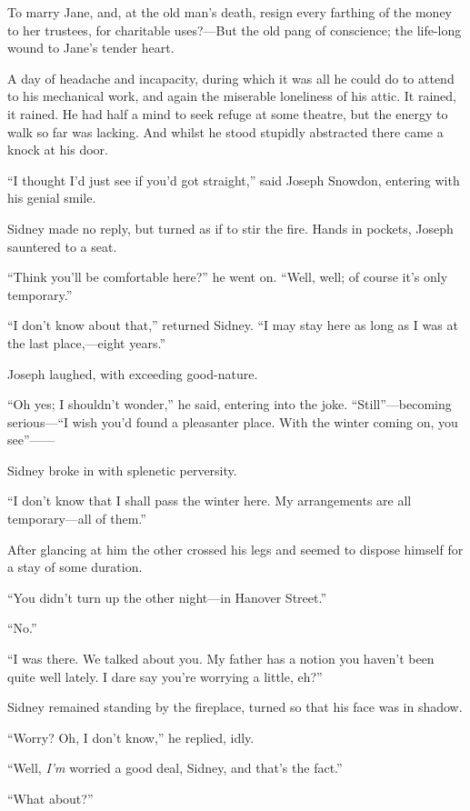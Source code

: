 To marry Jane, and, at the old man's death, resign every farthing of the
money to her trustees, for charitable uses?---But the old pang of
conscience; the life-long wound to Jane's tender heart.

{}A day of headache and incapacity, during which it was all he could do
to attend to his mechanical work, and again the miserable loneliness of
his attic. It rained, it rained. He had half a mind to seek refuge at
some theatre, but the energy to walk so far was lacking. And whilst he
stood stupidly abstracted there came a knock at his door.

``I thought I'd just see if you'd got straight,'' said Joseph Snowdon,
entering with his genial smile.

Sidney made no reply, but turned as if to stir the fire. Hands in
pockets, Joseph sauntered to a seat.

``Think you'll be comfortable here?'' he went on. ``Well, well; of
course it's only temporary.''

``I don't know about that,'' returned Sidney. ``I may stay here as long
as I was at the last place,---eight years.''

Joseph laughed, with exceeding good-nature.

``Oh yes; I shouldn't wonder,'' he said, entering into the joke.
``Still''---becoming {}serious---``I wish you'd found a pleasanter
place. With the winter coming on, you see''{{------}}

Sidney broke in with splenetic perversity.

``I don't know that I shall pass the winter here. My arrangements are
all temporary---all of them.''

After glancing at him the other crossed his legs and seemed to dispose
himself for a stay of some duration.

``You didn't turn up the other night---in Hanover Street.''

``No.''

``I was there. We talked about you. My father has a notion you haven't
been quite well lately. I dare say you're worrying a little, eh?''

Sidney remained standing by the fireplace, turned so that his face was
in shadow.

``Worry? Oh, I don't know,'' he replied, idly.

``Well, \emph{I'm} worried a good deal, Sidney, and that's the fact.''

``What about?''

